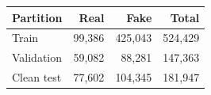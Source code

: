 \begin{tabular}{lrrr}
\toprule
Partition & Real & Fake & Total \\
\midrule
Train & 99,386 & 425,043 & 524,429 \\
Validation & 59,082 & 88,281 & 147,363 \\
Clean test & 77,602 & 104,345 & 181,947 \\
\bottomrule
\end{tabular}
